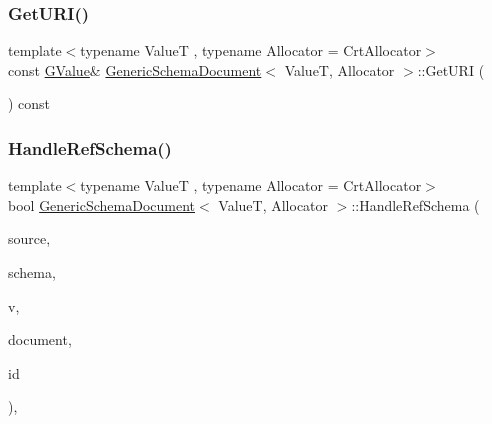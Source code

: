 \subsubsection{\texorpdfstring{Get\+U\+R\+I()}{GetURI()}}
{\footnotesize\ttfamily template$<$typename ValueT , typename Allocator  = Crt\+Allocator$>$ \\
const \hyperlink{classGenericSchemaDocument_a777505b09fff6cf23b8cfed9e0350eec}{G\+Value}\& \hyperlink{classGenericSchemaDocument}{Generic\+Schema\+Document}$<$ ValueT, Allocator $>$\+::Get\+U\+RI (\begin{DoxyParamCaption}{ }\end{DoxyParamCaption}) const\hspace{0.3cm}{\ttfamily [inline]}}

\mbox{\label{classGenericSchemaDocument_a3debb209124c74e4498334a42f6f0244}} 
\subsubsection{\texorpdfstring{Handle\+Ref\+Schema()}{HandleRefSchema()}}
{\footnotesize\ttfamily template$<$typename ValueT , typename Allocator  = Crt\+Allocator$>$ \\
bool \hyperlink{classGenericSchemaDocument}{Generic\+Schema\+Document}$<$ ValueT, Allocator $>$\+::Handle\+Ref\+Schema (\begin{DoxyParamCaption}\item[{const \hyperlink{classGenericSchemaDocument_aeb62f562d4dc024402b00f97cbcef747}{Pointer\+Type} \&}]{source,  }\item[{const \hyperlink{classGenericSchemaDocument_acaf115202b159a2eb72c97c3dc6c3895}{Schema\+Type} $\ast$$\ast$}]{schema,  }\item[{const \hyperlink{classGenericSchemaDocument_ae246f1b6573a5a8a2c0d73d4eb64d53a}{Value\+Type} \&}]{v,  }\item[{const \hyperlink{classGenericSchemaDocument_ae246f1b6573a5a8a2c0d73d4eb64d53a}{Value\+Type} \&}]{document,  }\item[{const \hyperlink{classGenericSchemaDocument_afcfefaab7eecec6849d478557392e23c}{Uri\+Type} \&}]{id }\end{DoxyParamCaption})\hspace{0.3cm}{\ttfamily [inline]}, {\ttfamily [private]}}

